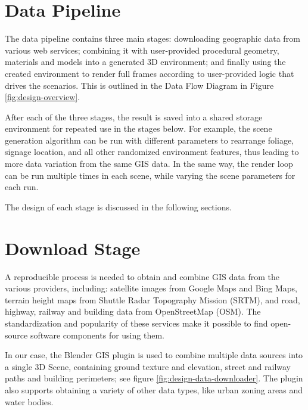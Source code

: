\section{Data Pipeline}
\label{sec:data-pipeline}

The data pipeline contains three main stages: downloading geographic data from various web services; combining it with user-provided procedural geometry, materials and models into a generated 3D environment; and finally using the created environment to render full frames according to user-provided logic that drives the scenarios. This is outlined in the Data Flow Diagram in Figure \ref{fig:design-overview}.



After each of the three stages, the result is saved into a shared storage environment for repeated use in the stages below. For example, the scene generation algorithm can be run with different parameters to rearrange foliage, signage location, and all other randomized environment features, thus leading to more data variation from the same GIS data. In the same way, the render loop can be run multiple times in each scene, while varying the scene parameters for each run.

The design of each stage is discussed in the following sections.

\section{Download Stage}
\label{sec:download-stage}

A reproducible process is needed to obtain and combine GIS data from the various providers, including: satellite images from Google Maps and Bing Maps, terrain height maps from Shuttle Radar Topography Mission (SRTM), and road, highway, railway and building data from OpenStreetMap (OSM). The standardization and popularity of these services make it possible to find open-source software components for using them. 

In our case, the Blender GIS plugin is used to combine multiple data sources into a single 3D Scene, containing ground texture and elevation, street and railway paths and building perimeters; see figure \ref{fig:design-data-downloader}. The plugin also supports obtaining a variety of other data types, like urban zoning areas and water bodies.

